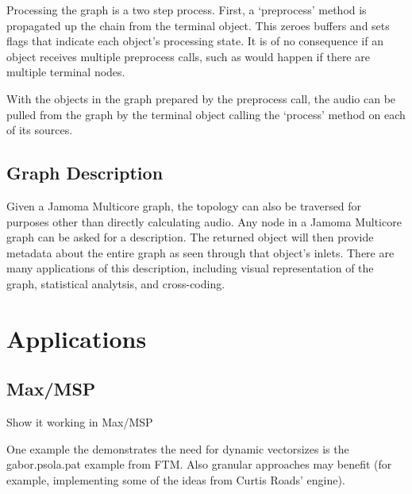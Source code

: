 \documentclass[twoside,a4paper]{article}
\begin{document}
Processing the graph is a two step process.  First, a `preprocess' method is propagated up the chain from the terminal object.  This zeroes buffers and sets flags that indicate each object's processing state.  It is of no consequence if an object receives multiple preprocess calls, such as would happen if there are multiple terminal nodes.

With the objects in the graph prepared by the preprocess call, the audio can be pulled from the graph by the terminal object calling the `process' method on each of its sources.




\subsection{Graph Description} %

Given a Jamoma Multicore graph, the topology can also be traversed for purposes other than directly calculating audio.  Any node in a Jamoma Multicore graph can be asked for a description.  The returned  object will then provide metadata about the entire graph as seen through that object's inlets.  There are many applications of this description, including visual representation of the graph, statistical analytsis, and cross-coding.







\section{Applications} %

\subsection{Max/MSP} %

Show it working in Max/MSP

One example the demonstrates the need for dynamic vectorsizes is the gabor.psola.pat example from FTM. Also granular approaches may benefit (for example, implementing some of the ideas from Curtis Roads' engine).
\end{document}
